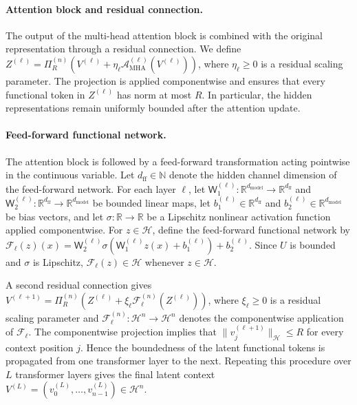 \paragraph{Attention block and residual connection.}

The output of the multi-head attention block is combined with the original representation through a residual connection. We define \(Z^{(\ell)}=\Pi_R^{(n)}(V^{(\ell)}+\eta_\ell\mathcal A_{\mathrm{MHA}}^{(\ell)}(V^{(\ell)}))\), where \(\eta_\ell\geqslant0\) is a residual scaling parameter.
The projection is applied componentwise and ensures that every functional token in \(Z^{(\ell)}\) has norm at most \(R\). In particular, the hidden representations remain uniformly bounded after the attention update.

\paragraph{Feed-forward functional network.}

The attention block is followed by a feed-forward transformation acting pointwise in the continuous variable. Let \(d_{\mathrm{ff}}\in\mathbb N\) denote the hidden channel dimension of the feed-forward network. For each layer \(\ell\), let \(\mathsf W_1^{(\ell)}:\mathbb R^{d_{\mathrm{model}}}\to\mathbb R^{d_{\mathrm{ff}}}\) and \(\mathsf W_2^{(\ell)}:\mathbb R^{d_{\mathrm{ff}}}\to\mathbb R^{d_{\mathrm{model}}}\) be bounded linear maps, let \(b_1^{(\ell)}\in\mathbb R^{d_{\mathrm{ff}}}\) and \(b_2^{(\ell)}\in\mathbb R^{d_{\mathrm{model}}}\) be bias vectors, and let \(\sigma:\mathbb R\to\mathbb R\) be a Lipschitz nonlinear activation function applied componentwise. For \(z\in\mathcal H\), define the feed-forward functional network by \(\mathcal F_\ell(z)(x)=\mathsf W_2^{(\ell)}\sigma\!\left(\mathsf W_1^{(\ell)}z(x)+b_1^{(\ell)}\right)+b_2^{(\ell)}\). Since \(U\) is bounded and \(\sigma\) is Lipschitz, \(\mathcal F_\ell(z)\in\mathcal H\) whenever \(z\in\mathcal H\).

A second residual connection gives \(V^{(\ell+1)}=\Pi_R^{(n)}(Z^{(\ell)}+\xi_\ell\mathcal F_\ell^{(n)}(Z^{(\ell)}))\), where \(\xi_\ell\geqslant0\) is a residual scaling parameter and \(\mathcal F_\ell^{(n)}:\mathcal H^n\to\mathcal H^n\) denotes the componentwise application of \(\mathcal F_\ell\). The componentwise projection implies that \(\|v_j^{(\ell+1)}\|_{\mathcal H}\leqslant R\) for every context position \(j\). Hence the boundedness of the latent functional tokens is propagated from one transformer layer to the next. Repeating this procedure over \(L\) transformer layers gives the final latent context \(V^{(L)}=(v_0^{(L)},\ldots,v_{n-1}^{(L)})\in\mathcal H^n\).

